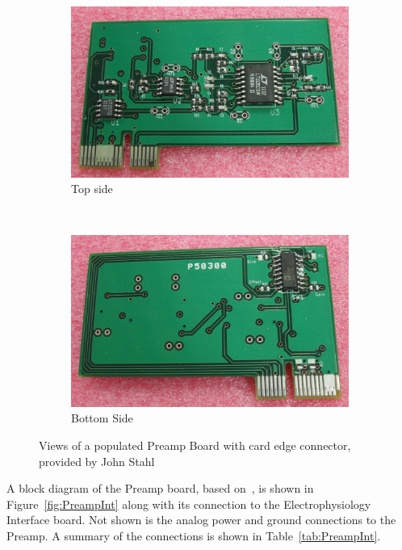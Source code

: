 \begin{figure}[h]
	\centering 
	\begin{singlespace}
	\begin{subfigure}[b]{\textwidth}
		\centering 
		\includegraphics{./figures/PreAmpTop} 
	\caption{Top side\label{fig:patop}}
	\end{subfigure}
	\\
	\begin{subfigure}[b]{\textwidth}
		\centering 
		\includegraphics{./figures/PreAmpBot} 
	\caption{Bottom Side\label{fig:pabot}}
	\end{subfigure}
	\caption{Views of a populated Preamp Board with card edge connector, provided by John Stahl\label{fig:PreampBoard}}
	\end{singlespace}
\end{figure}

A block diagram of the Preamp board, based on~\cite{Jimbo2003,StahlMSEE}, is shown in Figure~\ref{fig:PreampInt} along with its connection to the Electrophysiology Interface board.  Not shown is the analog power and ground connections to the Preamp.  A summary of the connections is shown in Table~\ref{tab:PreampInt}.

